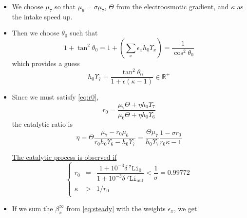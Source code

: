 \documentclass[aps,onecolumn,10pt]{revtex4}
\newcommand{\mychem}[1]{\mathtt{#1}}
\newcommand{\spLi}[1]{{~^{\mychem{#1}}\mychem{Li}}}
\newcommand{\deltaLi}{ {\delta\!\!\!\spLi{7}} }
\newcommand{\deltaLiOut}{{\deltaLi}_{\mathrm{out}}}
\begin{document}
\begin{itemize}
\item We choose $\mu_7$ so that $\mu_6=\sigma\mu_7$, $\Theta$ from the electroosmotic gradient, and $\kappa$ as the intake speed up.
\item Then we choose $\theta_0$ such that
\begin{equation}
\boxed{
	1+\tan^2\theta_0 = 1+\left(\sum_x \epsilon_x h_0 \Upsilon_x \right) = \dfrac{1}{\cos^2\theta_0}
	}
\end{equation}
which provides a guess
\begin{equation}
	h_0\Upsilon_7 = \dfrac{\tan^2\theta_0}{ 1+\epsilon\left(\kappa-1\right)} \in \mathbb{R}^+
\end{equation}
\item Since we must satisfy \eqref{eq:r0},
\begin{equation}
	r_0 = \dfrac{\mu_7\Theta+\eta h_0 \Upsilon_7}{\mu_6\Theta+\eta h_0 \Upsilon_6}
\end{equation}
the catalytic ratio is
\begin{equation}
	\eta = \Theta\dfrac{\mu_7-r_0\mu_6}{r_0 h_0 \Upsilon_6-h_0\Upsilon_7} 
	= \dfrac{\Theta\mu_7}{h_0\Upsilon_7} \dfrac{1-\sigma r_0}{r_0\kappa-1}
\end{equation}

{
	\underline{The catalytic process is observed if}
\begin{equation}
\boxed{
\left\lbrace
\begin{array}{rcl}
	r_0 & = & \dfrac{1+10^{-3}\deltaLi_0}{1+10^{-3}\deltaLiOut} < \dfrac{1}{\sigma} = 0.99772\\
	\kappa & > & 1/r_0\\
\end{array}
\right.
}
\end{equation}
}

\item
If we sum the $\beta_x^\infty$ from \eqref{eq:steady} with the weights $\epsilon_x$, we get


\end{itemize}
\end{document}
